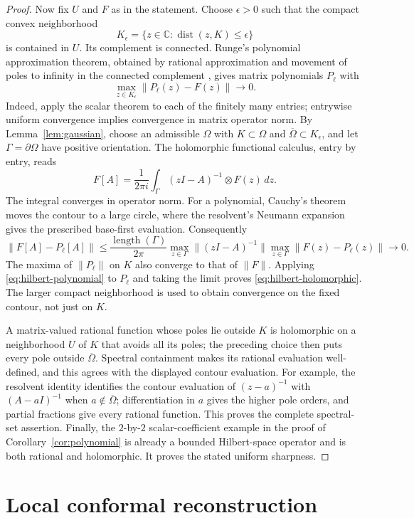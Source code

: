 \documentclass[11pt]{article}
\newcommand{\C}{\mathbb C}
\DeclareMathOperator{\dist}{dist}
\theoremstyle{definition}
\theoremstyle{remark}
\numberwithin{equation}{section}
\begin{document}
\begin{proof}
Now fix $U$ and $F$ as in the statement. Choose $\epsilon>0$ such that the
compact convex neighborhood
\[
 K_\epsilon=\{z\in\C:\dist(z,K)\le\epsilon\}
\]
is contained in $U$. Its complement is connected. Runge's polynomial
approximation theorem, obtained by rational approximation and movement of
poles to infinity in the connected complement
\cite[pp.~235--238]{Runge1885}, gives matrix polynomials $P_\ell$ with
\[
 \max_{z\in K_\epsilon}\|P_\ell(z)-F(z)\|\longrightarrow0.
\]
Indeed, apply the scalar theorem to each of the finitely many entries;
entrywise uniform convergence implies convergence in matrix operator norm.
By Lemma~\ref{lem:gaussian}, choose an admissible $\Omega$ with
$K\subset\Omega$ and $\overline\Omega\subset K_\epsilon$, and let
$\Gamma=\partial\Omega$ have positive orientation. The holomorphic
functional calculus, entry by entry, reads
\[
 F[A]=\frac{1}{2\pi i}\int_\Gamma
        (zI-A)^{-1}\otimes F(z)\,dz.
\]
The integral converges in operator norm. For a polynomial, Cauchy's theorem
moves the contour to a large circle, where the resolvent's Neumann expansion
gives the prescribed base-first evaluation. Consequently
\[
 \|F[A]-P_\ell[A]\|
 \le\frac{\operatorname{length}(\Gamma)}{2\pi}
     \max_{z\in\Gamma}\|(zI-A)^{-1}\|
     \max_{z\in\Gamma}\|F(z)-P_\ell(z)\|
 \longrightarrow0.
\]
The maxima of $\|P_\ell\|$ on $K$ also converge to that of $\|F\|$.
Applying \eqref{eq:hilbert-polynomial} to $P_\ell$ and taking the limit
proves \eqref{eq:hilbert-holomorphic}. The larger compact neighborhood is
used to obtain convergence on the fixed contour, not just on $K$.

A matrix-valued rational function whose poles lie outside $K$ is holomorphic
on a neighborhood $U$ of $K$ that avoids all its poles; the preceding choice
then puts every pole outside $\overline\Omega$. Spectral containment makes
its rational evaluation well-defined, and this agrees with the displayed contour
evaluation. For example, the resolvent identity identifies the contour
evaluation of $(z-a)^{-1}$ with $(A-aI)^{-1}$ when $a\notin\overline\Omega$;
differentiation in $a$ gives the higher pole orders, and partial
fractions give every rational function. This proves the complete spectral-set
assertion. Finally, the $2$-by-$2$ scalar-coefficient example in the proof of
Corollary~\ref{cor:polynomial} is already a bounded Hilbert-space operator
and is both rational and holomorphic. It proves the stated uniform sharpness.
\end{proof}

\appendix
\section{Local conformal reconstruction}
\label{sec:conformal-appendix}
\end{document}
